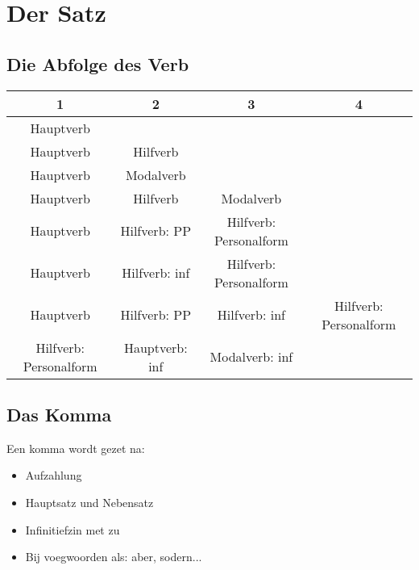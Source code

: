\documentclass[main.tex]{subfiles}
\begin{document}
\chapter{Der Satz}
\section{Die Abfolge des Verb}

\begin{tabular}{|c|c|c|c|}
\hline
1 & 2 & 3 & 4 \\
\hline
Hauptverb &  &  &  \\ 

Hauptverb & Hilfverb &  &  \\ 

Hauptverb & Modalverb &  &  \\ 

Hauptverb & Hilfverb & Modalverb &  \\ 
 
Hauptverb & Hilfverb: PP & Hilfverb: Personalform &  \\ 

Hauptverb & Hilfverb: inf & Hilfverb: Personalform &  \\ 

Hauptverb & Hilfverb: PP & Hilfverb: inf & Hilfverb: Personalform \\ 

Hilfverb: Personalform & Hauptverb: inf & Modalverb: inf &  \\ 
\hline
\end{tabular} 

\section{Das Komma}

Een komma wordt gezet na:
\begin{itemize}
\item Aufzahlung
\item Hauptsatz und Nebensatz
\item Infinitiefzin met zu
\item Bij voegwoorden als: aber, sodern...
\end{itemize}
\end{document}
